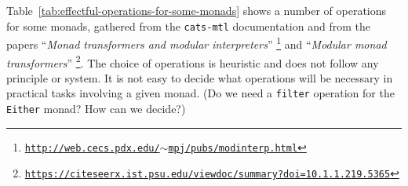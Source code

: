 Table~\ref{tab:effectful-operations-for-some-monads} shows a number
of operations for some monads, gathered from the \texttt{cats-mtl}
documentation and from the papers \textsf{``}\emph{Monad transformers and
modular interpreters}\textsf{''} \footnote{\texttt{\href{http://web.cecs.pdx.edu/~mpj/pubs/modinterp.html}{http://web.cecs.pdx.edu/$\sim$mpj/pubs/modinterp.html}}}
and \textsf{``}\emph{Modular monad transformers}\textsf{''} \footnote{\texttt{\href{https://citeseerx.ist.psu.edu/viewdoc/summary?doi=10.1.1.219.5365}{https://citeseerx.ist.psu.edu/viewdoc/summary?doi=10.1.1.219.5365}}}.
The choice of operations is heuristic and does not follow any principle
or system. It is not easy to decide what operations will be necessary
in practical tasks involving a given monad. (Do we need a \lstinline!filter!
operation for the \lstinline!Either! monad? How can we decide?)

